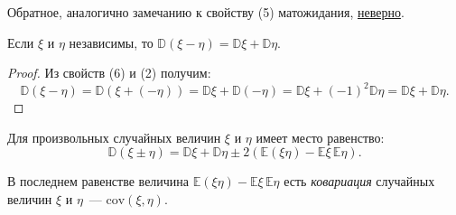 \begin{enumerate}
        \begin{rmrk}
            Обратное, аналогично замечанию к свойству (5) матожидания, \hyperlink{counter_exmp_independence}{неверно}.
        \end{rmrk} 
        
        \begin{crlr}
            Если $\xi$ и $\eta$ независимы, то $\mathbb{D}(\xi-\eta)=\mathbb{D} \xi+\mathbb{D} \eta$. 
        \end{crlr} 
        
        \begin{proof}
            Из свойств (6) и (2) получим: 
            $$\mathbb{D}(\xi-\eta)=\mathbb{D}(\xi+(-\eta))=\mathbb{D} \xi+\mathbb{D}(-\eta)=\mathbb{D} \xi+(-1)^{2} \mathbb{D} \eta=\mathbb{D} \xi+\mathbb{D} \eta.$$
        \end{proof} 
        
        \begin{crlr}
            Для произвольных случайных величин $\xi$ и $\eta$ имеет место равенство:
            $$\mathbb{D}(\xi \pm \eta)=\mathbb{D} \xi+\mathbb{D} \eta \pm 2(\mathbb{E}(\xi \eta)-\mathbb{E} \xi\, \mathbb{E} \eta).$$
        \end{crlr} 
    
        \begin{rmrk}
        В последнем равенстве величина $\mathbb{E}(\xi \eta)-\mathbb{E} \xi \, \mathbb{E} \eta$ есть \textit{ковариация} случайных величин $\xi$ и $\eta$~--- $\text{cov}(\xi, \eta)$.
        \end{rmrk}
    
\end{enumerate}

